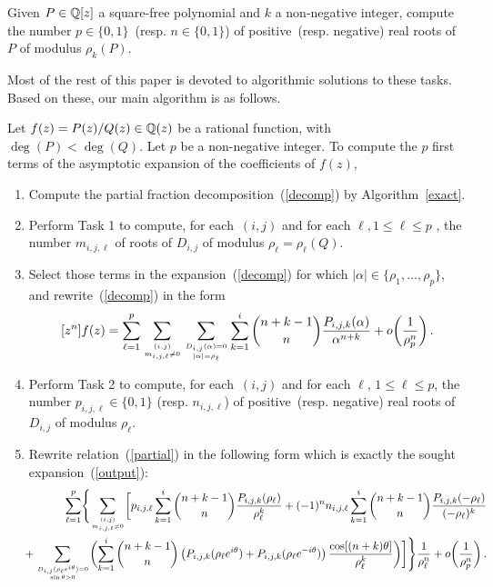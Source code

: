\begin{task}
Given $P \in {\Bbb Q}[z]$ a square-free polynomial and $k$ a non-negative
integer, compute the number $p \in \{ 0,1 \}$~(resp. $n
\in \{ 0,1 \}$) of positive~(resp. negative) real roots of $P$ of
modulus $\rho_k(P)$.
\end{task}

Most of the rest of this paper is devoted to algorithmic solutions to
these tasks. Based on these, our main algorithm is as follows.

\begin{alg}\label{total}
Let $f(z)=P(z)/Q(z) \in {\Bbb Q}(z)$ be a rational function, with $\deg(P)<
\deg(Q)$. Let $p$ be a non-negative integer. To compute the $p$ first
terms of the asymptotic expansion of the coefficients of $f(z)$,
\begin{enumerate}
\item Compute the partial fraction decomposition~(\ref{decomp}) by Algorithm~\ref{exact}.
\item Perform Task 1 to compute, for each~$(i,j)$ and for each $\ell, 1
\leq \ell \leq p$ , the number $m_{i,j,\ell}$ of roots of $D_{i,j}$ of modulus
$\rho_\ell=\rho_\ell(Q)$.
\item Select those terms in the expansion~(\ref{decomp}) for which
$|\alpha|\in\{\rho_1,\ldots,\rho_p\}$, and
rewrite~(\ref{decomp}) in the form
\begin{equation}\label{partial}
[z^n]f(z)=\sum_{\ell=1}^p\sum_{(i,j) \atop m_{i,j,\ell} \not=0}
\sum_{D_{i,j}(\alpha)=0 \atop |\alpha|=\rho_\ell}\sum_{k=1}^i
{n+k-1 \choose n}
{P_{i,j,k}(\alpha) \over 
\alpha^{n+k}} + o\!\left({1 \over \rho_p^n} \right).
\end{equation}
\item Perform Task 2 to compute, for each~$(i,j)$ and for each $\ell$, $1
\leq \ell \leq p$, the number $p_{i,j,\ell} \in \{ 0,1 \}$ (resp.
$n_{i,j,\ell}$) of positive~(resp. negative) real roots of $D_{i,j}$ of modulus $\rho_\ell$.
\item Rewrite relation~(\ref{partial}) in the following form which is
exactly the sought expansion~(\ref{output}):
\begin{eqnarray*}
&&\hskip-1cm\sum_{\ell=1}^p
\Biggl\{ \sum_{(i,j) \atop m_{i,j,\ell} \not=0} \biggl[
p_{i,j,\ell}\sum_{k=1}^i
{n+k-1 \choose n}{P_{i,j,k}(\rho_\ell)\over\rho_\ell^k}
+(-1)^nn_{i,j,\ell}\sum_{k=1}^i 
{n+k-1 \choose n}
{P_{i,j,k}(-\rho_\ell)\over(-\rho_\ell)^k}\\
&&\hskip-0.5cm+\sum_{D_{i,j}(\rho_\ell e^{i \theta})=0 \atop \sin\theta>0}
\biggl( \sum_{k=1}^i 
{n+k-1 \choose n}
\left( P_{i,j,k}(\rho_\ell e^{i\theta}) + P_{i,j,k}(\rho_\ell e^{-i \theta}) 
\right)
{\cos[(n+k)\theta]\over\rho_\ell^k}\biggr)\biggr] \Biggr\}
{1 \over \rho_\ell^n} 
+o\!\left({1 \over \rho_p^n}
\right).
\end{eqnarray*}
\end{enumerate}
\end{alg}


